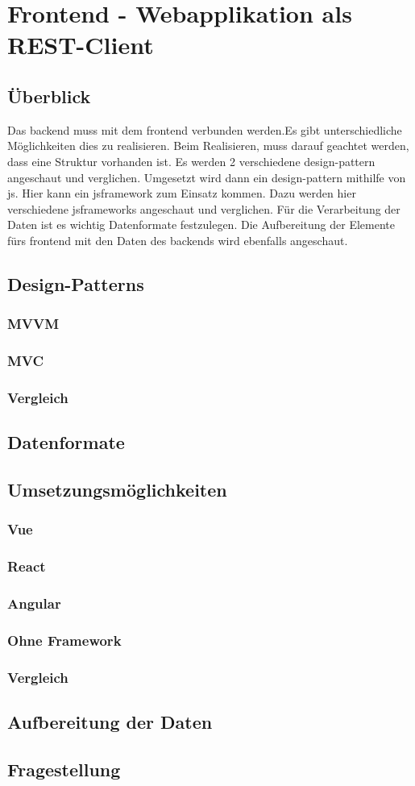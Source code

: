 \section{Frontend - Webapplikation als REST-Client}
\subsection{Überblick}
Das \Gls{backend} muss mit dem \Gls{frontend} verbunden werden.Es gibt unterschiedliche Möglichkeiten dies zu realisieren. Beim Realisieren, muss darauf geachtet werden, dass eine Struktur vorhanden ist. Es werden 2 verschiedene \Gls{design-pattern} angeschaut und verglichen. Umgesetzt wird dann ein \Gls{design-pattern} mithilfe von \Gls{js}. Hier kann ein \Gls{jsframework} zum Einsatz kommen. Dazu werden hier verschiedene \Gls{jsframework}s angeschaut und verglichen. Für die Verarbeitung der Daten ist es wichtig Datenformate festzulegen. Die Aufbereitung der Elemente fürs \Gls{frontend} mit den Daten des \Gls{backend}s wird ebenfalls angeschaut.
\subsection{Design-Patterns}
\subsubsection{MVVM}
\subsubsection{MVC}
\subsubsection{Vergleich}
\subsection{Datenformate}
\subsection{Umsetzungsmöglichkeiten}
\subsubsection{Vue}
\subsubsection{React}
\subsubsection{Angular}
\subsubsection{Ohne Framework}
\subsubsection{Vergleich}
\subsection{Aufbereitung der Daten}
\subsection{Fragestellung}